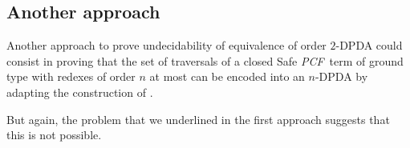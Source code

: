 \documentclass{article}
\newcommand{\encode}[1]{\ulcorner #1 \urcorner}
\newcommand{\nat}{\mathbb{N}}
\newcommand{\betared}{\rightarrow_\beta}
\newcommand\pcf{\textsl{PCF}}
\begin{document}
%
%
%

\subsection{Another approach}

Another approach to prove undecidability of equivalence of order $2$-DPDA could consist in proving that the set of traversals of a closed Safe \pcf\ term of ground type with redexes of order $n$ at most can be encoded into an $n$-DPDA by adapting the construction of \cite{KNU02}. 

But again, the problem that we underlined in the first approach suggests  that this is not possible. 



\end{document}

